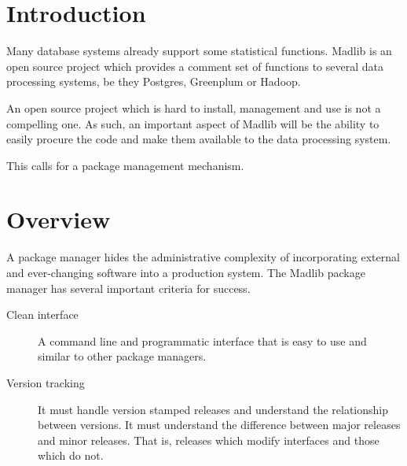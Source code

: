 \documentclass[11pt]{article}
\newcommand{\versionnumber}{0.1}
\begin{document}
{
\noindent\hspace*{\centeroffset}

\noindent\makebox[0pt][l]
{\begin{minipage}{\textwidth}
\flushright
Version~\versionnumber{}.
\end{minipage}}

\newpage

\tableofcontents
\newpage

\section{Introduction}

Many database systems already support some statistical functions. Madlib is an
open source project which provides a comment set of functions to several data
processing systems, be they Postgres, Greenplum or Hadoop.

An open source project which is hard to install, management and use is not a
compelling one. As such, an important aspect of Madlib will be the ability to
easily procure the code and make them available to the data processing system.

This calls for a package management mechanism.

\ifx\pdfoutput\undefined %
\else
{}
\fi
\section{Overview}

A package manager hides the administrative complexity of incorporating external
and ever-changing software into a production system. The Madlib package manager
has several important criteria for success.

	\begin{description}
		\item[Clean interface] A command line and programmatic interface
		that is easy to use and similar to other package managers.

		\item[Version tracking] It must handle version stamped releases and
		understand the relationship between versions. It must understand
		the difference between major releases and minor releases. That is,
		releases which modify interfaces and those which do not.


\end{description}}
\end{document}
